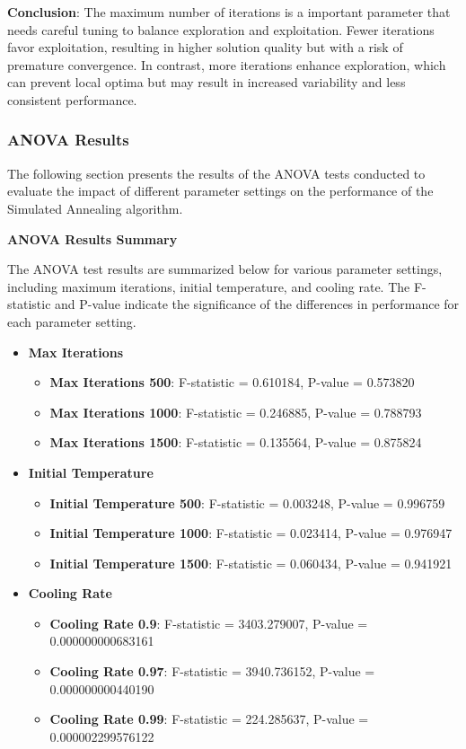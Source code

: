 \documentclass[
]{article}
\begin{document}
    \textbf{Conclusion}: The maximum number of iterations is a important parameter that needs careful tuning to balance exploration and exploitation. Fewer iterations favor exploitation, resulting in higher solution quality but with a risk of premature convergence. In contrast, more iterations enhance exploration, which can prevent local optima but may result in increased variability and less consistent performance.

    \subsubsection{ANOVA Results}

    The following section presents the results of the ANOVA tests conducted to evaluate the impact of different parameter settings on the performance of the Simulated Annealing algorithm.

    \textbf{ANOVA Results Summary}

    The ANOVA test results are summarized below for various parameter settings, including maximum iterations, initial temperature, and cooling rate. The F-statistic and P-value indicate the significance of the differences in performance for each parameter setting.

    \begin{itemize}
        \item \textbf{Max Iterations}
        \begin{itemize}
            \item \textbf{Max Iterations 500}: F-statistic = 0.610184, P-value = 0.573820
            \item \textbf{Max Iterations 1000}: F-statistic = 0.246885, P-value = 0.788793
            \item \textbf{Max Iterations 1500}: F-statistic = 0.135564, P-value = 0.875824
        \end{itemize}
        \item \textbf{Initial Temperature}
        \begin{itemize}
            \item \textbf{Initial Temperature 500}: F-statistic = 0.003248, P-value = 0.996759
            \item \textbf{Initial Temperature 1000}: F-statistic = 0.023414, P-value = 0.976947
            \item \textbf{Initial Temperature 1500}: F-statistic = 0.060434, P-value = 0.941921
        \end{itemize}
        \item \textbf{Cooling Rate}
        \begin{itemize}
            \item \textbf{Cooling Rate 0.9}: F-statistic = 3403.279007, P-value = 0.000000000683161
            \item \textbf{Cooling Rate 0.97}: F-statistic = 3940.736152, P-value = 0.000000000440190
            \item \textbf{Cooling Rate 0.99}: F-statistic = 224.285637, P-value = 0.000002299576122
        \end{itemize}
    \end{itemize}
\end{document}
